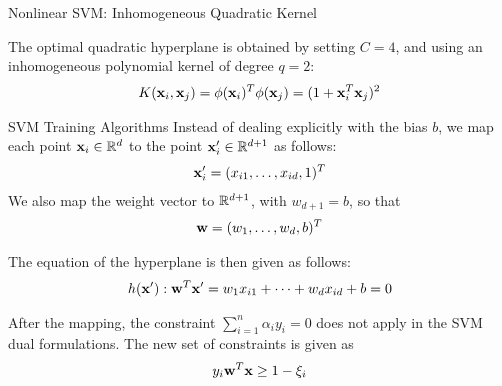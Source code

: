 \begin{frame}{Nonlinear SVM: Inhomogeneous Quadratic Kernel}
\begin{figure}[!t]
\end{figure}
The optimal quadratic hyperplane is obtained by setting $C=4$, and
using an inhomogeneous polynomial kernel
of degree $q=2$:
    \begin{align*}
        K(\mathbf{x}_i, \mathbf{x}_{j}) = \phi(\mathbf{x}_i)^T\phi(\mathbf{x}_{j})= (1 +
        \mathbf{x}_i^T\mathbf{x}_{j})^2
    \end{align*}
\end{frame}



\begin{frame}{SVM Training Algorithms}
Instead of dealing
explicitly with the bias $b$, we map each point $\mathbf{x}_i \in
{\mathord{\mathbb R}}^d$ to the point $\mathbf{x}'_i \in {\mathord{\mathbb R}}^{d+1}$ as follows:
\begin{align*}
    \mathbf{x}'_i = (x_{i1},\ldots,x_{id},1)^T
\end{align*}
We also map the weight vector to ${\mathord{\mathbb R}}^{d+1}$, with
$w_{d+1} = b$,
so that
\begin{align*}
\mathbf{w} = (w_1, \ldots, w_d, b)^T 
\end{align*}

\medskip
The equation of the hyperplane
is then given as follows:
\begin{align*}
    h(\mathbf{x}'): \mathbf{w}^T\mathbf{x}' = 
    w_1x_{i1} + \cdots + w_dx_{id} + b = 0
\end{align*}

\medskip
After the mapping, the constraint $\sum_{i=1}^n \alpha_i y_i =
0$ does not apply in the SVM dual formulations.
The new set of constraints is
given as
\begin{align*}
y_i \mathbf{w}^T\mathbf{x} \ge 1 - \xi_i
\end{align*}
\end{frame}



